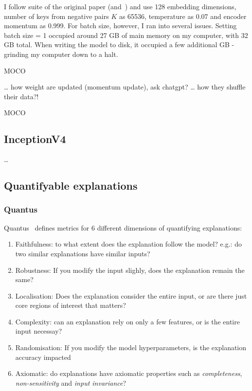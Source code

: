 \documentclass[10pt,twocolumn,letterpaper]{article}
\begin{document}
I follow suite of the original paper (and~\cite{moco}) and use 128 embedding dimensions, number of keys from negative pairs $K$ as 65536, temperature as 0.07 and encoder momentum as 0.999. For batch size, however, I ran into several issues. Setting batch size = 1 occupied around 27 GB of main memory on my computer, with 32 GB total. When writing the model to disk, it occupied a few additional GB - grinding my computer down to a halt.

\gls{MOCO} 

\dots{} how weight are updated (momentum update), ask chatgpt?
\dots{} how they shuffle their data?! 

\gls{MOCO}

\subsection{InceptionV4}
\dots{}

\subsection{Quantifyable explanations}\label{sec:quantifiable}
\subsubsection{Quantus}

Quantus~\cite{hedstrom2023quantus} defines metrics for 6 different dimensions of quantifying explanations:
\begin{enumerate}
  \item Faithfulness: to what extent does the explanation follow the model? e.g.: do two similar explanations have similar inputs?
  \item Robustness: If you modify the input slighly, does the explanation remain the same?
  \item Localisation: Does the explanation consider the entire input, or are there just core regions of interest that matters?
  \item Complexity: can an explanation rely on only a few features, or is the entire input necessay?
  \item Randomisation: If you modify the model hyperparameters, is the explanation accuracy impacted
  \item Axiomatic: do explanations have axiomatic properties such as \textit{completeness}, \textit{non-sensitivity} and \textit{input invariance}?
\end{enumerate}
\end{document}

